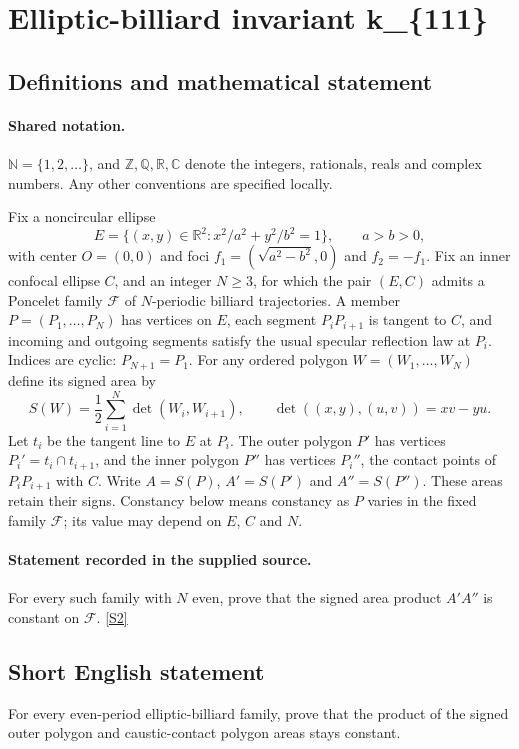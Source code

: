 \documentclass[11pt]{article}
\newcommand{\sref}[2]{\hyperlink{source:#1:#2}{[S#2]}}
\begin{document}
\section{Elliptic-billiard invariant k\_\{111\}}\label{statement}

\subsection{Definitions and mathematical statement}

\paragraph{Shared notation.}$\mathbb N=\{1,2,\ldots\}$, and $\mathbb Z,\mathbb Q,\mathbb R,\mathbb C$ denote the integers, rationals, reals and complex numbers. Any other conventions are specified locally.


Fix a noncircular ellipse
\[
E=\{(x,y)\in\mathbb R^2:x^2/a^2+y^2/b^2=1\},\qquad a>b>0,
\]
with center $O=(0,0)$ and foci $f_1=(\sqrt{a^2-b^2},0)$ and $f_2=-f_1$. Fix an inner confocal ellipse $C$, and an integer $N\geq3$, for which the pair $(E,C)$ admits a Poncelet family $\mathcal F$ of $N$-periodic billiard trajectories. A member $P=(P_1,\ldots,P_N)$ has vertices on $E$, each segment $P_iP_{i+1}$ is tangent to $C$, and incoming and outgoing segments satisfy the usual specular reflection law at $P_i$. Indices are cyclic: $P_{N+1}=P_1$.
For any ordered polygon $W=(W_1,\ldots,W_N)$ define its signed area by
\[
S(W)=\frac12\sum_{i=1}^N\det(W_i,W_{i+1}),\qquad
\det((x,y),(u,v))=xv-yu.
\]
Let $t_i$ be the tangent line to $E$ at $P_i$. The outer polygon $P'$ has vertices $P_i'=t_i\cap t_{i+1}$, and the inner polygon $P''$ has vertices $P_i''$, the contact points of $P_iP_{i+1}$ with $C$. Write $A=S(P)$, $A'=S(P')$ and $A''=S(P'')$. These areas retain their signs. Constancy below means constancy as $P$ varies in the fixed family $\mathcal F$; its value may depend on $E$, $C$ and $N$.

\paragraph{Statement recorded in the supplied source.}
For every such family with $N$ even, prove that the signed area product $A' A''$ is constant on $\mathcal F$. \sref{statement}{2}
\subsection{Short English statement}
For every even-period elliptic-billiard family, prove that the product of the signed outer polygon and caustic-contact polygon areas stays constant.
\end{document}
